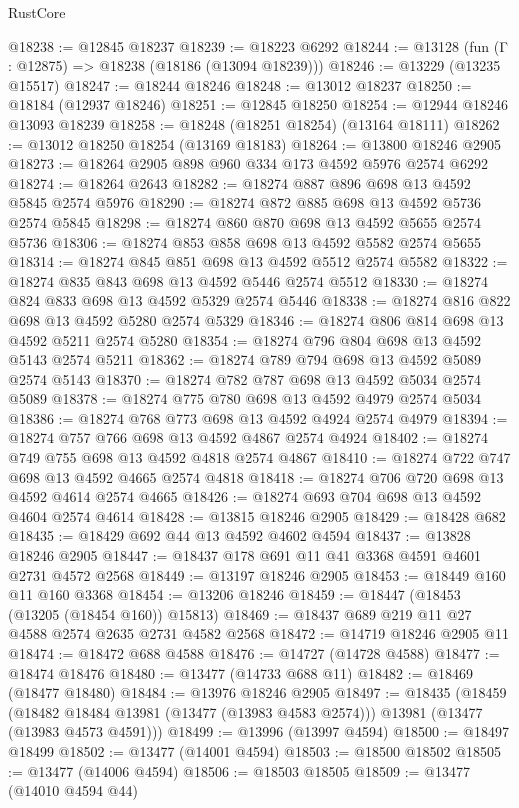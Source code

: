 \begin{lexlean}{RustCore}
\begin{coremodule}
@18238 := @12845 @18237
@18239 := @18223 @6292
@18244 := @13128 (fun (Γ : @12875) => @18238 (@18186 (@13094 @18239)))
@18246 := @13229 (@13235 @15517)
@18247 := @18244 @18246
@18248 := @13012 @18237
@18250 := @18184 (@12937 @18246)
@18251 := @12845 @18250
@18254 := @12944 @18246 @13093 @18239
@18258 := @18248 (@18251 @18254) (@13164 @18111)
@18262 := @13012 @18250 @18254 (@13169 @18183)
@18264 := @13800 @18246 @2905
@18273 := @18264 @2905 @898 @960 @334 @173 @4592 @5976 @2574 @6292
@18274 := @18264 @2643
@18282 := @18274 @887 @896 @698 @13 @4592 @5845 @2574 @5976
@18290 := @18274 @872 @885 @698 @13 @4592 @5736 @2574 @5845
@18298 := @18274 @860 @870 @698 @13 @4592 @5655 @2574 @5736
@18306 := @18274 @853 @858 @698 @13 @4592 @5582 @2574 @5655
@18314 := @18274 @845 @851 @698 @13 @4592 @5512 @2574 @5582
@18322 := @18274 @835 @843 @698 @13 @4592 @5446 @2574 @5512
@18330 := @18274 @824 @833 @698 @13 @4592 @5329 @2574 @5446
@18338 := @18274 @816 @822 @698 @13 @4592 @5280 @2574 @5329
@18346 := @18274 @806 @814 @698 @13 @4592 @5211 @2574 @5280
@18354 := @18274 @796 @804 @698 @13 @4592 @5143 @2574 @5211
@18362 := @18274 @789 @794 @698 @13 @4592 @5089 @2574 @5143
@18370 := @18274 @782 @787 @698 @13 @4592 @5034 @2574 @5089
@18378 := @18274 @775 @780 @698 @13 @4592 @4979 @2574 @5034
@18386 := @18274 @768 @773 @698 @13 @4592 @4924 @2574 @4979
@18394 := @18274 @757 @766 @698 @13 @4592 @4867 @2574 @4924
@18402 := @18274 @749 @755 @698 @13 @4592 @4818 @2574 @4867
@18410 := @18274 @722 @747 @698 @13 @4592 @4665 @2574 @4818
@18418 := @18274 @706 @720 @698 @13 @4592 @4614 @2574 @4665
@18426 := @18274 @693 @704 @698 @13 @4592 @4604 @2574 @4614
@18428 := @13815 @18246 @2905
@18429 := @18428 @682
@18435 := @18429 @692 @44 @13 @4592 @4602 @4594
@18437 := @13828 @18246 @2905
@18447 := @18437 @178 @691 @11 @41 @3368 @4591 @4601 @2731 @4572 @2568
@18449 := @13197 @18246 @2905
@18453 := @18449 @160 @11 @160 @3368
@18454 := @13206 @18246
@18459 := @18447 (@18453 (@13205 (@18454 @160)) @15813)
@18469 := @18437 @689 @219 @11 @27 @4588 @2574 @2635 @2731 @4582 @2568
@18472 := @14719 @18246 @2905 @11
@18474 := @18472 @688 @4588
@18476 := @14727 (@14728 @4588)
@18477 := @18474 @18476
@18480 := @13477 (@14733 @688 @11)
@18482 := @18469 (@18477 @18480)
@18484 := @13976 @18246 @2905
@18497 := @18435
    (@18459
      (@18482 @18484 @13981 (@13477 (@13983 @4583 @2574)))
      @13981
      (@13477 (@13983 @4573 @4591)))
@18499 := @13996 (@13997 @4594)
@18500 := @18497 @18499
@18502 := @13477 (@14001 @4594)
@18503 := @18500 @18502
@18505 := @13477 (@14006 @4594)
@18506 := @18503 @18505
@18509 := @13477 (@14010 @4594 @44)

\end{coremodule}
\end{lexlean}
